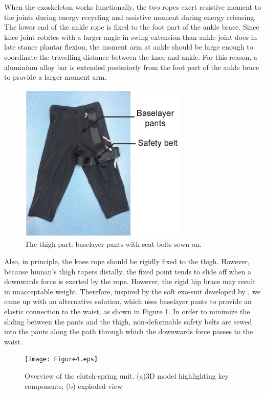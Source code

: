 \documentclass[twocolumn,cleanfoot,10pt]{asme2ej}
\begin{document}
When the exoskeleton works functionally, the two ropes exert resistive moment to the joints during energy recycling and assistive moment during energy releasing. The lower end of the ankle rope is fixed to the foot part of the ankle brace. Since knee joint rotates with a larger angle in swing extension than ankle joint does in late stance plantar flexion, the moment arm at ankle should be large enough to coordinate the travelling distance between the knee and ankle. For this reason, a aluminium alloy bar is extended posteriorly from the foot part of the ankle brace to provide a larger moment arm. 

\begin{figure}[b]
	\centering
	\includegraphics[width=8cm]{Figure3.eps}
	\caption{The thigh part: baselayer pants with seat belts sewn on.}
	\label{fig:pants}   
\end{figure}

Also, in principle, the knee rope should be rigidly fixed to the thigh. However, because human’s thigh tapers distally, the fixed point tends to slide off when a downwards force is exerted by the rope. However, the rigid hip brace may result in unacceptable weight. Therefore, inspired by the soft exo-suit developed by \cite{RN20}, we came up with an alternative solution, which uses baselayer pants to provide an elastic connection to the waist, as shown in Figure \ref{fig:pants}. In order to minimize the sliding between the pants and the thigh, non-deformable safety belts are sewed into the pants along the path through which the downwards force passes to the waist.

\begin{figure}[t]
	\centering
	\texttt{[image: Figure4.eps]}
	\caption{Overview of the clutch-spring unit. (a)3D model highlighting key components; (b) exploded view}
	\label{fig:clutch}   
\end{figure}
\end{document}
